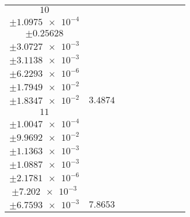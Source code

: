 \documentclass[8pt]{article}
\begin{document}
\begin{longtable}[l]{c c c c c c c c c}
$\num{10}$ & \begin{tabular}[c]{@{}c@{}}$\num{2.6169e-2}$ \\ $\pm\num{1.0975e-4}$\end{tabular} & \begin{tabular}[c]{@{}c@{}}$\num{0.25562}$ \\ $\pm\num{0.25628}$\end{tabular} & \begin{tabular}[c]{@{}c@{}}$\num{1.9818}$ \\ $\pm\num{3.0727e-3}$\end{tabular} & \begin{tabular}[c]{@{}c@{}}$\num{1.4403e+3}$ \\ $\pm\num{3.1138e-3}$\end{tabular} & \begin{tabular}[c]{@{}c@{}}$\num{2.8814}$ \\ $\pm\num{6.2293e-6}$\end{tabular} & \begin{tabular}[c]{@{}c@{}}$\num{3.7285}$ \\ $\pm\num{1.7949e-2}$\end{tabular} & \begin{tabular}[c]{@{}c@{}}$\num{3.7972}$ \\ $\pm\num{1.8347e-2}$\end{tabular} & $\num{3.4874}$\\
$\num{11}$ & \begin{tabular}[c]{@{}c@{}}$\num{5.7575e-2}$ \\ $\pm\num{1.0047e-4}$\end{tabular} & \begin{tabular}[c]{@{}c@{}}$\num{-0.17117}$ \\ $\pm\num{9.9692e-2}$\end{tabular} & \begin{tabular}[c]{@{}c@{}}$\num{7.0178}$ \\ $\pm\num{1.1363e-3}$\end{tabular} & \begin{tabular}[c]{@{}c@{}}$\num{1.4453e+3}$ \\ $\pm\num{1.0887e-3}$\end{tabular} & \begin{tabular}[c]{@{}c@{}}$\num{2.8914}$ \\ $\pm\num{2.1781e-6}$\end{tabular} & \begin{tabular}[c]{@{}c@{}}$\num{3.5028}$ \\ $\pm\num{7.202e-3}$\end{tabular} & \begin{tabular}[c]{@{}c@{}}$\num{3.3264}$ \\ $\pm\num{6.7593e-3}$\end{tabular} & $\num{7.8653}$\\

\end{longtable}
\end{document}
